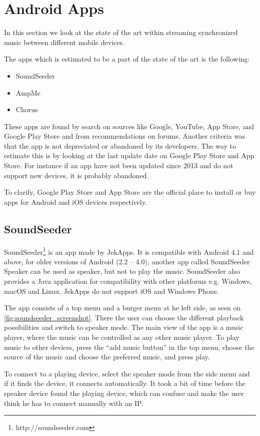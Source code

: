 \section{Android Apps}\label{sec:sota_apps}
In this section we look at the state of the art within streaming synchronized music between different mobile devices.

The apps which is estimated to be a part of the state of the art is the following:
\begin{itemize}
    \item SoundSeeder
    \item AmpMe
    \item Chorus
\end{itemize}

These apps are found by search on sources like Google, YouTube, App Store, and Google Play Store and from recommendations on forums. 
Another criteria was that the app is not depreciated or abandoned by its developers.
The way to estimate this is by looking at the last update date on Google Play Store and App Store.
For instance if an app have not been updated since 2013 and do not support new devices, it is probably abandoned.

To clarify, Google Play Store and App Store are the official place to install or buy apps for Android and iOS devices respectively.

\subsection{SoundSeeder}
SoundSeeder\footnote{http://soundseeder.com} is an app made by JekApps. 
It is compatible with Android 4.1 and above, for older versions of Android (2.2 -- 4.0),
another app called SoundSeeder Speaker can be used as speaker, but not to play the music.
SoundSeeder also provides a Java application for compatibility with other platforms e.g. Windows, macOS and Linux.
JekApps do not support iOS and Windows Phone\cite{soundseeder_ios}.

The app consists of a top menu and a burger menu at he left side, as seen on \cref{fig:soundseeder_screenshot}.
There the user can choose the different playback possibilities and switch to speaker mode.
The main view of the app is a music player, where the music can be controlled as any other music player. 
To play music to other devices, press the ``add music button'' in the top menu, choose the source of the music and choose the preferred music, and press play. 

To connect to a playing device, select the speaker mode from the side menu and if it finds the device, it connects automatically.
It took a bit of time before the speaker device found the playing device, which can confuse and make the user think he has to connect manually with an IP. 

